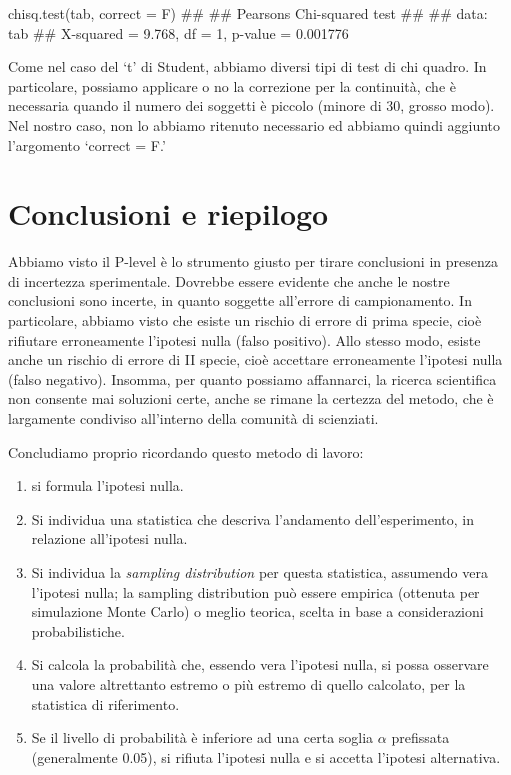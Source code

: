 \documentclass[a4paper,12pt,oneside]{book}
\providecommand{\tightlist}{%
  \setlength{\itemsep}{0pt}\setlength{\parskip}{0pt}}
\newenvironment{Shaded}{\begin{snugshade}}{\end{snugshade}}
\newcommand{\DocumentationTok}[1]{#1}
\newcommand{\FunctionTok}[1]{#1}
\newcommand{\AttributeTok}[1]{#1}
\newcommand{\NormalTok}[1]{#1}
\begin{document}
\begin{Shaded}
\begin{Highlighting}[]
\FunctionTok{chisq.test}\NormalTok{(tab, }\AttributeTok{correct =}\NormalTok{ F)}
\DocumentationTok{\#\# }
\DocumentationTok{\#\#  Pearson\textquotesingle{}s Chi{-}squared test}
\DocumentationTok{\#\# }
\DocumentationTok{\#\# data:  tab}
\DocumentationTok{\#\# X{-}squared = 9.768, df = 1, p{-}value = 0.001776}
\end{Highlighting}
\end{Shaded}

Come nel caso del `t' di Student, abbiamo diversi tipi di test di chi quadro. In particolare, possiamo applicare o no la correzione per la continuità, che è necessaria quando il numero dei soggetti è piccolo (minore di 30, grosso modo). Nel nostro caso, non lo abbiamo ritenuto necessario ed abbiamo quindi aggiunto l'argomento `correct = F.'

\hypertarget{conclusioni-e-riepilogo}{%
\section{Conclusioni e riepilogo}\label{conclusioni-e-riepilogo}}

Abbiamo visto il P-level è lo strumento giusto per tirare conclusioni in presenza di incertezza sperimentale. Dovrebbe essere evidente che anche le nostre conclusioni sono incerte, in quanto soggette all'errore di campionamento. In particolare, abbiamo visto che esiste un rischio di errore di prima specie, cioè rifiutare erroneamente l'ipotesi nulla (falso positivo). Allo stesso modo, esiste anche un rischio di errore di II specie, cioè accettare erroneamente l'ipotesi nulla (falso negativo). Insomma, per quanto possiamo affannarci, la ricerca scientifica non consente mai soluzioni certe, anche se rimane la certezza del metodo, che è largamente condiviso all'interno della comunità di scienziati.

Concludiamo proprio ricordando questo metodo di lavoro:

\begin{enumerate}
\def\labelenumi{\arabic{enumi}.}
\tightlist
\item
  si formula l'ipotesi nulla.
\item
  Si individua una statistica che descriva l'andamento dell'esperimento, in relazione all'ipotesi nulla.
\item
  Si individua la \emph{sampling distribution} per questa statistica, assumendo vera l'ipotesi nulla; la sampling distribution può essere empirica (ottenuta per simulazione Monte Carlo) o meglio teorica, scelta in base a considerazioni probabilistiche.
\item
  Si calcola la probabilità che, essendo vera l'ipotesi nulla, si possa osservare una valore altrettanto estremo o più estremo di quello calcolato, per la statistica di riferimento.
\item
  Se il livello di probabilità è inferiore ad una certa soglia \(\alpha\) prefissata (generalmente 0.05), si rifiuta l'ipotesi nulla e si accetta l'ipotesi alternativa.
\end{enumerate}
\end{document}
